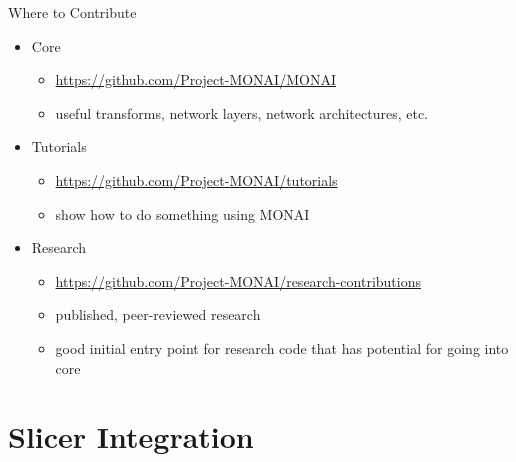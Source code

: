 \documentclass[10pt,aspectratio=169,dvipsnames]{beamer}
\begin{document}
\begin{frame}{Where to Contribute}
\begin{itemize}
	\item Core
	\begin{itemize}
		\item \url{https://github.com/Project-MONAI/MONAI}
		\item useful transforms, network layers, network architectures, etc.
	\end{itemize}
	\item Tutorials
	\begin{itemize}
		\item \url{https://github.com/Project-MONAI/tutorials}
		\item show how to do something using MONAI
	\end{itemize}
	\item Research
	\begin{itemize}
		\item \url{https://github.com/Project-MONAI/research-contributions}
		\item published, peer-reviewed research
		\item good initial entry point for research code that has potential for going into core
	\end{itemize}
\end{itemize}
\end{frame}


\section{Slicer Integration}
\end{document}
